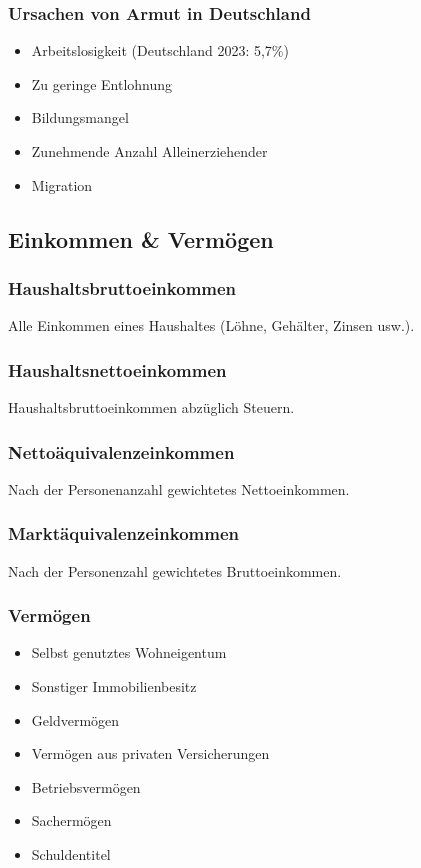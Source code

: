 \documentclass{article}
\begin{document}
	\subsubsection{Ursachen von Armut in Deutschland}

	\begin{itemize}
		\item Arbeitslosigkeit (Deutschland 2023: 5,7\%)
		\item Zu geringe Entlohnung
		\item Bildungsmangel
		\item Zunehmende Anzahl Alleinerziehender
		\item Migration
	\end{itemize}

	\subsection{Einkommen \& Vermögen}

	\subsubsection{Haushaltsbruttoeinkommen}
	Alle Einkommen eines Haushaltes (Löhne, Gehälter, Zinsen usw.).

	\subsubsection{Haushaltsnettoeinkommen}
	Haushaltsbruttoeinkommen abzüglich Steuern.

	\subsubsection{Nettoäquivalenzeinkommen}
	Nach der Personenanzahl gewichtetes Nettoeinkommen.

	\subsubsection{Marktäquivalenzeinkommen}
	Nach der Personenzahl gewichtetes Bruttoeinkommen. 

	\subsubsection{Vermögen}

	\begin{itemize}
		\item Selbst genutztes Wohneigentum
		\item Sonstiger Immobilienbesitz
		\item Geldvermögen
		\item Vermögen aus privaten Versicherungen
		\item Betriebsvermögen
		\item Sachermögen
		\item Schuldentitel
	\end{itemize}
\end{document}
